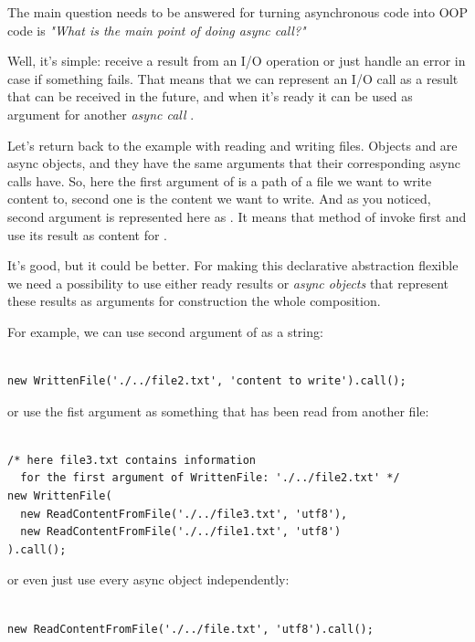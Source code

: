 \documentclass{article}
\newcommand{\cit}[1]{{\fontfamily{qcr}\selectfont{\textit{\textcolor{superdarkgray}{#1}}}}}
\begin{document}
The main question needs to be answered for turning asynchronous code into OOP code is \textit{"What is the main point of doing async call?"}

Well, it's simple: receive a result from an I/O operation or just handle an error in case if something fails. That means that we can represent an I/O call as a result that can be received in the future, and when it's ready it can be used as argument for another \textit{ async call }.

Let's return back to the example with reading and writing files. Objects \cit{WrittenFile} and \cit{ReadContentFromFile} are async objects, and they have the same arguments that their corresponding async calls have. So, here the first argument of \cit{WrittenFile} is a path of a file we want to write content to, second one is the content we want to write. And as you noticed, second argument is represented here as \cit{ReadContentFromFile}. It means that method \cit{call()} of \cit{WrittenFile} invoke first \cit{ReadContentFromFile} and use its result as content for \cit{WrittenFile}.

It's good, but it could be better. For making this declarative abstraction flexible we need a possibility to use either ready results or \textit{async objects} that represent these results as arguments for construction the whole composition.

For example, we can use second argument of \cit{WrittenFile} as a string:

\begin{lstlisting}

new WrittenFile('./../file2.txt', 'content to write').call();

\end{lstlisting}
or use the fist argument as something that has been read from another file:

\begin{lstlisting}

/* here file3.txt contains information 
  for the first argument of WrittenFile: './../file2.txt' */
new WrittenFile(
  new ReadContentFromFile('./../file3.txt', 'utf8'), 
  new ReadContentFromFile('./../file1.txt', 'utf8')
).call();

\end{lstlisting}
or even just use every async object independently:

\begin{lstlisting}

new ReadContentFromFile('./../file.txt', 'utf8').call();

\end{lstlisting}
\end{document}
